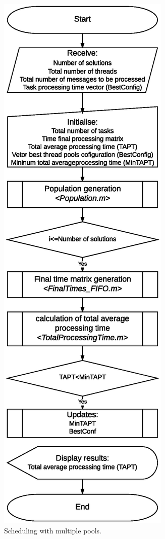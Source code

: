 \begin{figure}[h]
\centering
 \includegraphics[width=0.8\linewidth]{./figs/fluxogram.eps}
 \caption{Scheduling with multiple pools.}
\label{fig:fluxogram}
\end{figure}
